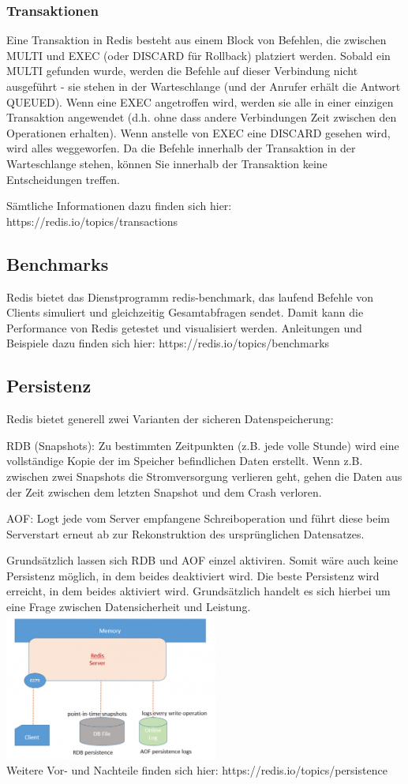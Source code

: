 \subsubsection{Transaktionen}
Eine Transaktion in Redis besteht aus einem Block von Befehlen, die zwischen MULTI und EXEC (oder DISCARD für Rollback) platziert werden. Sobald ein MULTI gefunden wurde, werden die Befehle auf dieser Verbindung nicht ausgeführt - sie stehen in der Warteschlange (und der Anrufer erhält die Antwort QUEUED). Wenn eine EXEC angetroffen wird, werden sie alle in einer einzigen Transaktion angewendet (d.h. ohne dass andere Verbindungen Zeit zwischen den Operationen erhalten). Wenn anstelle von EXEC eine DISCARD gesehen wird, wird alles weggeworfen. Da die Befehle innerhalb der Transaktion in der Warteschlange stehen, können Sie innerhalb der Transaktion keine Entscheidungen treffen.

Sämtliche Informationen dazu finden sich hier: https://redis.io/topics/transactions

\subsection{Benchmarks}
Redis bietet das Dienstprogramm redis-benchmark, das laufend Befehle von Clients simuliert und gleichzeitig Gesamtabfragen sendet. Damit kann die Performance von Redis getestet und visualisiert werden.
Anleitungen und Beispiele dazu finden sich hier: https://redis.io/topics/benchmarks

\subsection{Persistenz}
Redis bietet generell zwei Varianten der sicheren Datenspeicherung:

RDB (Snapshots): Zu bestimmten Zeitpunkten (z.B. jede volle Stunde) wird eine vollständige Kopie der im Speicher befindlichen Daten erstellt. Wenn z.B. zwischen zwei Snapshots die Stromversorgung verlieren geht, gehen die Daten aus der Zeit zwischen dem letzten Snapshot und dem Crash verloren. 

AOF: Logt jede vom Server empfangene Schreiboperation und führt diese beim Serverstart erneut ab zur Rekonstruktion des ursprünglichen Datensatzes.

Grundsätzlich lassen sich RDB und AOF einzel aktiviren. Somit wäre auch keine Persistenz möglich, in dem beides deaktiviert wird. Die beste Persistenz wird erreicht, in dem beides aktiviert wird. Grundsätzlich handelt es sich hierbei um eine Frage zwischen Datensicherheit und Leistung.\\
\includegraphics[width=70mm]{media/redis.png}\\[10mm]	
Weitere Vor- und Nachteile finden sich hier: https://redis.io/topics/persistence
